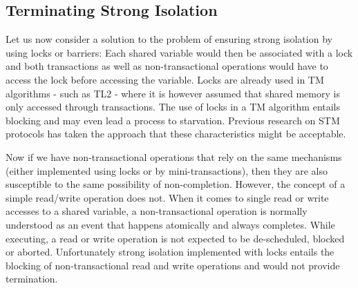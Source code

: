 \subsection{Terminating Strong  Isolation}
\label{sec:protocol}


Let us now consider a solution to  the problem of  ensuring strong isolation 
by using  locks or barriers: Each shared
variable would then  
be associated with a lock and both transactions as well as non-transactional 
operations would have to access the lock before accessing the variable.
Locks are already used  in TM algorithms - such as TL2 \cite{DSS06} - where it is
however     assumed   that  shared   memory   is   only  accessed   through
transactions. The use  of locks  in a TM algorithm  entails blocking and may
even lead a process to starvation.
Previous research on STM protocols has taken the approach that
these characteristics might be acceptable.

Now if we have non-transactional operations that rely on the same mechanisms
(either implemented using locks or by mini-transactions), then they are also susceptible
to the same possibility of non-completion.
However, the concept of a simple read/write operation does not.
When it  comes to single read or  write accesses  to  a shared
variable, a  non-transactional operation is normally understood  as an
event  that  happens   atomically  and always  completes.
While executing, a  read  or write  operation   is  not 
expected  to  be de-scheduled, blocked or aborted.  
Unfortunately   strong
isolation  implemented with  locks  entails the blocking  
of non-transactional read and write operations and would not provide termination.

